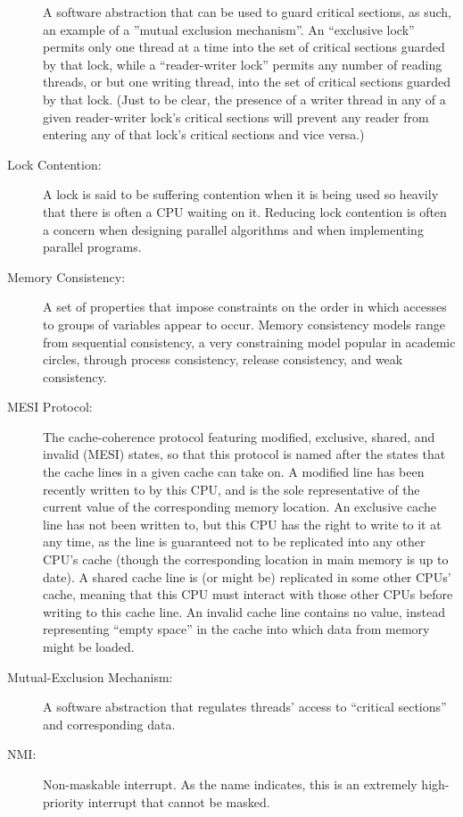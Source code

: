 \begin{description}
	A software abstraction that can be used to guard critical sections,
	as such, an example of a ''mutual exclusion mechanism''.
	An ``exclusive lock'' permits only one thread at a time into the
	set of critical sections guarded by that lock, while a
	``reader-writer lock'' permits any number of reading
	threads, or but one writing thread, into the set of critical
	sections guarded by that lock.  (Just to be clear, the presence
	of a writer thread in any of a given reader-writer lock's
	critical sections will prevent any reader from entering
	any of that lock's critical sections and vice versa.)
\item[Lock Contention:]
	A lock is said to be suffering contention when it is being
	used so heavily that there is often a CPU waiting on it.
	Reducing lock contention is often a concern when designing
	parallel algorithms and when implementing parallel programs.
\item[Memory Consistency:]
	A set of properties that impose constraints on the order in
	which accesses to groups of variables appear to occur.
	Memory consistency models range from sequential consistency,
	a very constraining model popular in academic circles, through
	process consistency, release consistency, and weak consistency.
\item[MESI Protocol:]
	The
	cache-coherence protocol featuring
	modified, exclusive, shared, and invalid (MESI) states,
	so that this protocol is named after the states that the
	cache lines in a given cache can take on.
	A modified line has been recently written to by this CPU,
	and is the sole representative of the current value of
	the corresponding memory location.
	An exclusive cache line has not been written to, but this
	CPU has the right to write to it at any time, as the line
	is guaranteed not to be replicated into any other CPU's cache
	(though the corresponding location in main memory is up to date).
	A shared cache line is (or might be) replicated in some other
	CPUs' cache, meaning that this CPU must interact with those other
	CPUs before writing to this cache line.
	An invalid cache line contains no value, instead representing
	``empty space'' in the cache into which data from memory might
	be loaded.
\item[Mutual-Exclusion Mechanism:]
	A software abstraction that regulates threads' access to
	``critical sections'' and corresponding data.
\item[NMI:]
	Non-maskable interrupt.
	As the name indicates, this is an extremely high-priority
	interrupt that cannot be masked.

\end{description}
